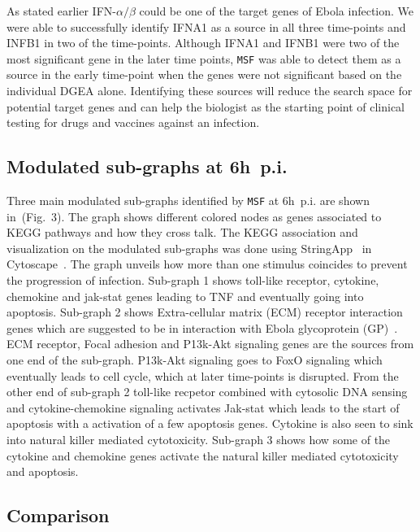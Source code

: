 \documentclass[10pt,a4paper,twocolumn]{article}
\begin{document}
As stated earlier IFN-$\alpha / \beta$ could be one of the target
genes of Ebola infection. We were able to successfully identify IFNA1
as a source in all three time-points and INFB1 in two of the
time-points. Although IFNA1 and IFNB1 were two of the most significant
gene in the later time points, \texttt{MSF} was able to detect them as
a source in the early time-point when the genes were not significant
based on the individual DGEA alone. Identifying these sources will
reduce the search space for potential target genes and can help the
biologist as the starting point of clinical testing for drugs and
vaccines against an infection.

\subsection*{Modulated sub-graphs at 6h~p.i.}

 Three main modulated sub-graphs identified by \texttt{MSF} at 6h~p.i.
 are shown in~(Fig.~3). The graph shows different colored nodes as
 genes associated to KEGG pathways and how they cross talk. The KEGG
 association and visualization on the modulated sub-graphs was done
 using StringApp~\cite{StringApp} in Cytoscape~\cite{Cyto}. The graph
 unveils how more than one stimulus coincides to prevent the
 progression of infection. Sub-graph 1 shows toll-like receptor,
 cytokine, chemokine and jak-stat genes leading to TNF and eventually
 going into apoptosis. Sub-graph 2 shows Extra-cellular matrix (ECM)
 receptor interaction genes which are suggested to be in interaction
 with Ebola glycoprotein (GP)~\cite{Veljkovic}. ECM receptor, Focal
 adhesion and P13k-Akt signaling genes are the sources from one end of
 the sub-graph. P13k-Akt signaling goes to FoxO signaling which
 eventually leads to cell cycle, which at later time-points is
 disrupted. From the other end of sub-graph 2 toll-like recpetor
 combined with cytosolic DNA sensing and cytokine-chemokine signaling
 activates Jak-stat which leads to the start of apoptosis with a
 activation of a few apoptosis genes. Cytokine is also seen to sink
 into natural killer mediated cytotoxicity. Sub-graph 3 shows how some
 of the cytokine and chemokine genes activate the natural killer
 mediated cytotoxicity and apoptosis.



\subsection*{Comparison}
\end{document}
